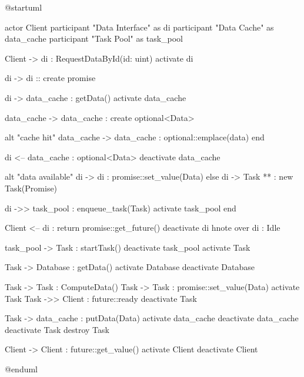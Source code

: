 \begin{plantuml}
    @startuml

    actor Client
    participant "Data Interface" as di
    participant "Data Cache" as data_cache
    participant "Task Pool" as task_pool

    Client -> di : RequestDataById(id: uint)
    activate di

    di -> di :: create promise

    di -> data_cache : getData()
    activate data_cache

    data_cache -> data_cache : create optional<Data>

    alt "cache hit"
    data_cache -> data_cache : optional::emplace(data)
    end

    di <-- data_cache : optional<Data>
    deactivate data_cache

    alt "data available"
    di -> di : promise::set_value(Data)
    else
    di -> Task ** : new Task(Promise)

    di ->> task_pool : enqueue_task(Task)
    activate task_pool
    end

    Client <-- di : return promise::get_future()
    deactivate di
    hnote over di : Idle

    task_pool -> Task : startTask()
    deactivate task_pool
    activate Task

    Task -> Database : getData()
    activate Database
    deactivate Database

    Task -> Task : ComputeData()
    Task -> Task : promise::set_value(Data)
    activate Task
    Task ->> Client : future::ready
    deactivate Task

    Task -> data_cache : putData(Data)
    activate data_cache
    deactivate data_cache
    deactivate Task
    destroy Task


    Client -> Client : future::get_value()
    activate Client
    deactivate Client

    @enduml
\end{plantuml}
